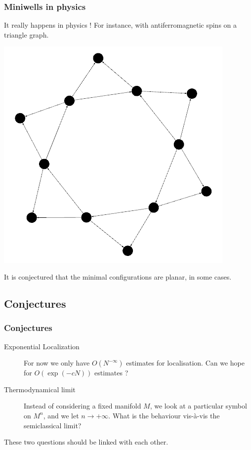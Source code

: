 \documentclass[mathserif]{beamer}
\begin{document}
\begin{frame}
\frametitle{Miniwells in physics}
    It really happens in physics ! For instance, with
      antiferromagnetic spins on a triangle graph.
\begin{minipage}[l]{0.3\linewidth}
      \includegraphics[scale=0.2]{hexa.png}\end{minipage}\begin{minipage}[r]{0.65\linewidth}
      It is conjectured that the minimal configurations are planar, in
      some cases.
      \end{minipage}

\end{frame}
\subsection{Conjectures}
\begin{frame}
  \frametitle{Conjectures}
  \begin{description}
  \item[Exponential Localization] For now we only have
    $O(N^{-\infty})$ estimates for localisation. Can we hope for
    $O(\exp(-cN))$ estimates ?
  \item[Thermodynamical limit] Instead of considering a fixed manifold
    $M$, we look at a particular symbol on $M^n$, and we let $n\to
    +\infty$. What is the behaviour vis-à-vis the semiclassical limit?
  \end{description}

These two questions should be linked with each other.
\end{frame}
\end{document}
